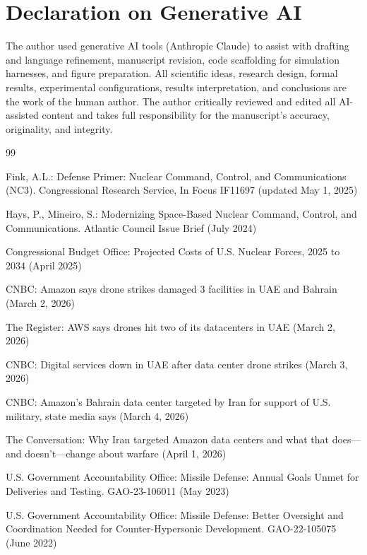 \documentclass[runningheads]{llncs}
\begin{document}
\section*{Declaration on Generative AI}
The author used generative AI tools (Anthropic Claude) to assist with drafting and language refinement, manuscript revision, code scaffolding for simulation harnesses, and figure preparation. All scientific ideas, research design, formal results, experimental configurations, results interpretation, and conclusions are the work of the human author. The author critically reviewed and edited all AI-assisted content and takes full responsibility for the manuscript's accuracy, originality, and integrity.

\begin{thebibliography}{99}

 Fink, A.L.: Defense Primer: Nuclear Command, Control, and Communications (NC3). Congressional Research Service, In Focus IF11697 (updated May 1, 2025)

 Hays, P., Mineiro, S.: Modernizing Space-Based Nuclear Command, Control, and Communications. Atlantic Council Issue Brief (July 2024)

 Congressional Budget Office: Projected Costs of U.S. Nuclear Forces, 2025 to 2034 (April 2025)

 CNBC: Amazon says drone strikes damaged 3 facilities in UAE and Bahrain (March 2, 2026)

 The Register: AWS says drones hit two of its datacenters in UAE (March 2, 2026)

 CNBC: Digital services down in UAE after data center drone strikes (March 3, 2026)

 CNBC: Amazon's Bahrain data center targeted by Iran for support of U.S. military, state media says (March 4, 2026)

 The Conversation: Why Iran targeted Amazon data centers and what that does---and doesn't---change about warfare (April 1, 2026)

 U.S. Government Accountability Office: Missile Defense: Annual Goals Unmet for Deliveries and Testing. GAO-23-106011 (May 2023)

 U.S. Government Accountability Office: Missile Defense: Better Oversight and Coordination Needed for Counter-Hypersonic Development. GAO-22-105075 (June 2022)


\end{thebibliography}
\end{document}

